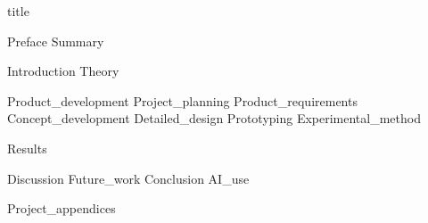 \documentclass{article}
\begin{document}
\hypersetup{pageanchor=false}
{title}

\frontmatter
\hypersetup{pageanchor=true}

{Preface}
\newpage
{Summary}
\newpage

\tableofcontents

\listoffigures
\listoftables

\mainmatter

{Introduction}
{Theory}

{Product_development}
{Project_planning}
{Product_requirements}
{Concept_development}
{Detailed_design}
{Prototyping}
{Experimental_method}

{Results}

{Discussion}
{Future_work}
{Conclusion}
{AI_use}

\newpage
\printbibliography[heading = bibintoc, title = Referanser]    %

\addappendix
{Project_appendices}

\end{document}
